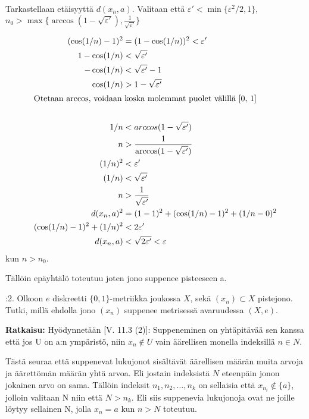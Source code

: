 \documentclass[12pt,a4paper,leqno]{amsart}
\begin{document}
Tarkastellaan etäisyyttä $d(x_n, a)$. Valitaan että $\varepsilon' < \min\{\varepsilon^2/2, 1\}$, $n_0 > \max\{\arccos(1 - \sqrt{\varepsilon'}), \frac{1}{\sqrt{\varepsilon'}} \}$

\begin{align*}
(\cos(1/n) - 1)^2 &= (1 - \cos(1/n))^2 < \varepsilon' \\
    1 - \cos(1/n) &< \sqrt{\varepsilon'} \\
    - \cos(1/n) &< \sqrt{\varepsilon'} - 1 \\
    \cos(1/n) &> 1 - \sqrt{\varepsilon'} \\
    \intertext{Otetaan arccos, voidaan koska molemmat puolet välillä [0, 1]} \\
    1/n &< arccos(1 - \sqrt{\varepsilon'}) \\
    n &> \frac{1}{\arccos(1 - \sqrt{\varepsilon'})} \\
    (1/n)^2 &< \varepsilon' \\
    (1/n) &< \sqrt{\varepsilon'} \\
    n &> \frac{1}{\sqrt{\varepsilon'}}\\
    d(x_n, a)^2 &= (1 - 1)^2 + (\cos(1/n) - 1)^2 + (1/n - 0)^2 \\
    (\cos(1/n) - 1)^2 + (1/n)^2 &< 2\varepsilon' \\
    d(x_n, a) &<  \sqrt{2\varepsilon'} < \varepsilon
\end{align*}
kun $n > n_0$.

Tällöin epäyhtälö toteutuu joten jono suppenee pisteeseen a.

\bigskip

:2. Olkoon $e$ diskreetti $\{0,1\}$-metriikka joukossa $X$, sekä $(x_n) \subset X$ pistejono. Tutki, millä ehdolla jono $(x_n)$ suppenee metrisessä 
avaruudessa $(X,e)$.

\textbf{Ratkaisu:}
Hyödynnetään [V. 11.3 (2)]: Suppeneminen on yhtäpitävää sen kanssa että jos U on a:n ympäristö, niin $x_n \notin U$ vain äärellisen monella indeksillä $n \in N$.

Tästä seuraa että suppenevat lukujonot sisältävät äärellisen määrän muita arvoja ja äärettömän määrän yhtä arvoa. Eli jostain indeksistä $N$ eteenpäin jonon jokainen arvo on sama. Tällöin indeksit $n_1, n_2, \dots, n_k$ on sellaisia että $x_{n_i} \notin \{a\}$, jolloin valitaan N niin että $N > n_k$. Eli siis suppenevia lukujonoja ovat ne joille löytyy sellainen N, jolla $x_n = a$ kun $n > N$ toteutuu.
\end{document}
